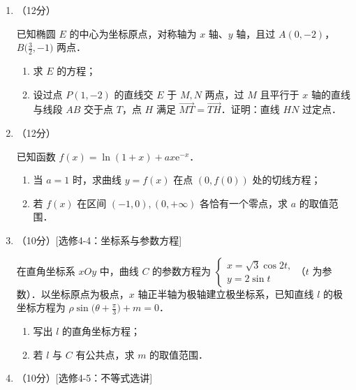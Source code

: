 \begin{description}
\begin{enumerate}[leftmargin=5pt]
\begin{enumerate}[label=(\arabic*)]
            附：相关系数 $r=\dfrac{\sum(x_i-\bar{x})(y_i-\bar{y})}{\sqrt{\sum(x_i-\bar{x})^2\sum(y_i-\bar{y})^2}}$，$\sqrt{1.896}\approx1.377$．
        \end{enumerate}

        \item （12分）

        已知椭圆 $E$ 的中心为坐标原点，对称轴为 $x$ 轴、$y$ 轴，且过 $A(0,-2)$，$B\bigl(\frac{3}{2},-1\bigr)$ 两点．

        \begin{enumerate}[label=(\arabic*)]
            \item 求 $E$ 的方程；
            \item 设过点 $P(1,-2)$ 的直线交 $E$ 于 $M,N$ 两点，过 $M$ 且平行于 $x$ 轴的直线与线段 $AB$ 交于点 $T$，点 $H$ 满足 $\overrightarrow{MT}=\overrightarrow{TH}$．证明：直线 $HN$ 过定点．
        \end{enumerate}

        \item （12分）

        已知函数 $f(x)=\ln(1+x)+ax\mathrm{e}^{-x}$．

        \begin{enumerate}[label=(\arabic*)]
            \item 当 $a=1$ 时，求曲线 $y=f(x)$ 在点 $(0,f(0))$ 处的切线方程；
            \item 若 $f(x)$ 在区间 $(-1,0),(0,+\infty)$ 各恰有一个零点，求 $a$ 的取值范围．
        \end{enumerate}

        \item （10分）[选修4-4：坐标系与参数方程]

        在直角坐标系 $xOy$ 中，曲线 $C$ 的参数方程为 $\begin{cases}x=\sqrt{3}\cos2t,\\y=2\sin t\end{cases}$（$t$ 为参数）．以坐标原点为极点，$x$ 轴正半轴为极轴建立极坐标系，已知直线 $l$ 的极坐标方程为 $\rho\sin\bigl(\theta+\frac{\pi}{3}\bigr)+m=0$．

        \begin{enumerate}[label=(\arabic*)]
            \item 写出 $l$ 的直角坐标方程；
            \item 若 $l$ 与 $C$ 有公共点，求 $m$ 的取值范围．
        \end{enumerate}

        \item （10分）[选修4-5：不等式选讲]


\end{enumerate}
\end{description}
